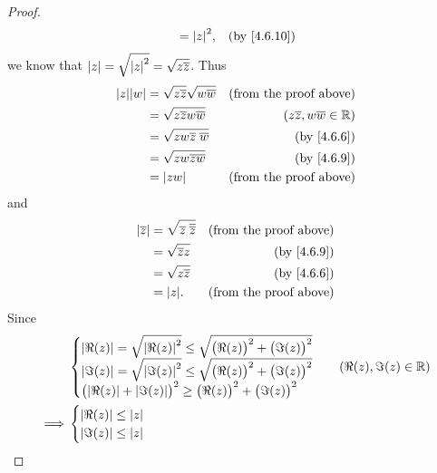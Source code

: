 \begin{proof}
\begin{align*}
                   & = \abs{z}^2,                                                                                    & \text{(by \cref{4.6.10})}
  \end{align*}
  we know that \(\left\lvert z\right\rvert = \sqrt{\left\lvert z\right\rvert^2} = \sqrt{z \overline{z}}\).
  Thus
  \begin{align*}
    \abs{z} \abs{w} & = \sqrt{z \overline{z}} \sqrt{w \overline{w}} & \text{(from the proof above)}           \\
                    & = \sqrt{z \overline{z} w \overline{w}}        & (z \overline{z}, w \overline{w} \in \R) \\
                    & = \sqrt{zw \overline{z} \; \overline{w}}      & \text{(by \cref{4.6.6})}                \\
                    & = \sqrt{zw \overline{zw}}                     & \text{(by \cref{4.6.9})}                \\
                    & = \abs{zw}                                    & \text{(from the proof above)}
  \end{align*}
  and
  \begin{align*}
    \abs{\overline{z}} & = \sqrt{\overline{z} \; \overline{\overline{z}}} & \text{(from the proof above)} \\
                       & = \sqrt{\overline{z} z}                          & \text{(by \cref{4.6.9})}      \\
                       & = \sqrt{z \overline{z}}                          & \text{(by \cref{4.6.6})}      \\
                       & = \abs{z}.                                       & \text{(from the proof above)}
  \end{align*}
  Since
  \begin{align*}
             & \begin{cases}
                 \abs{\Re(z)} = \sqrt{\abs{\Re(z)}^2} \leq \sqrt{\big(\Re(z)\big)^2 + \big(\Im(z)\big)^2} \\
                 \abs{\Im(z)} = \sqrt{\abs{\Im(z)}^2} \leq \sqrt{\big(\Re(z)\big)^2 + \big(\Im(z)\big)^2} \\
                 \big(\abs{\Re(z)} + \abs{\Im(z)}\big)^2 \geq \big(\Re(z)\big)^2 + \big(\Im(z)\big)^2
               \end{cases} & (\Re(z), \Im(z) \in \R) \\
    \implies & \begin{cases}
                 \abs{\Re(z)} \leq \abs{z} \\
                 \abs{\Im(z)} \leq \abs{z} \\

\end{cases}
\end{align*}
\end{proof}
